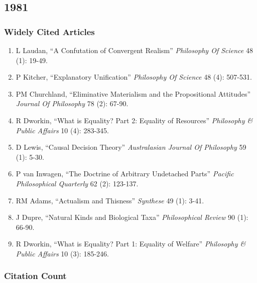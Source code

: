 \documentclass[
  10pt,
  letterpaper,
  DIV=11,
  numbers=noendperiod,
  twoside]{scrartcl}
\providecommand{\tightlist}{%
  \setlength{\itemsep}{0pt}\setlength{\parskip}{0pt}}\usepackage{longtable,booktabs,array}
\begin{document}
\newpage

\subsection{1981}\label{section-5}

\subsubsection*{Widely Cited Articles}\label{widely-cited-articles-5}

\begin{enumerate}
\def\labelenumi{\arabic{enumi}.}
\tightlist
\item
  L Laudan, ``A Confutation of Convergent Realism'' \emph{Philosophy Of
  Science} 48 (1): 19-49.
\item
  P Kitcher, ``Explanatory Unification'' \emph{Philosophy Of Science} 48
  (4): 507-531.
\item
  PM Churchland, ``Eliminative Materialism and the Propositional
  Attitudes'' \emph{Journal Of Philosophy} 78 (2): 67-90.
\item
  R Dworkin, ``What is Equality? Part 2: Equality of Resources''
  \emph{Philosophy \& Public Affairs} 10 (4): 283-345.
\item
  D Lewis, ``Causal Decision Theory'' \emph{Australasian Journal Of
  Philosophy} 59 (1): 5-30.
\item
  P van Inwagen, ``The Doctrine of Arbitrary Undetached Parts''
  \emph{Pacific Philosophical Quarterly} 62 (2): 123-137.
\item
  RM Adams, ``Actualism and Thisness'' \emph{Synthese} 49 (1): 3-41.
\item
  J Dupre, ``Natural Kinds and Biological Taxa'' \emph{Philosophical
  Review} 90 (1): 66-90.
\item
  R Dworkin, ``What is Equality? Part 1: Equality of Welfare''
  \emph{Philosophy \& Public Affairs} 10 (3): 185-246.
\end{enumerate}

\subsubsection*{Citation Count}\label{citation-count-5}
\end{document}
